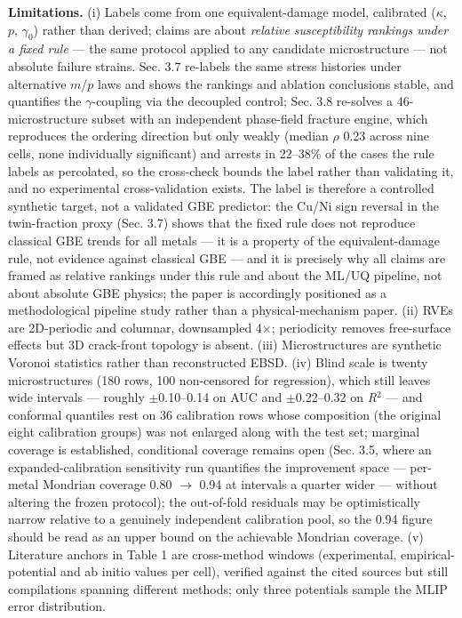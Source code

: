 \documentclass[11pt]{article}
\begin{document}
\textbf{Limitations.} (i) Labels come from one equivalent-damage model, calibrated ($\kappa$, $p$, $\gamma_0$) rather than derived; claims are about \textit{relative susceptibility rankings under a fixed rule} --- the same protocol applied to any candidate microstructure --- not absolute failure strains. Sec. 3.7 re-labels the same stress histories under alternative $m$/$p$ laws and shows the rankings and ablation conclusions stable, and quantifies the $\gamma$-coupling via the decoupled control; Sec. 3.8 re-solves a 46-microstructure subset with an independent phase-field fracture engine, which reproduces the ordering direction but only weakly (median $\rho$ 0.23 across nine cells, none individually significant) and arrests in 22--38\% of the cases the rule labels as percolated, so the cross-check bounds the label rather than validating it, and no experimental cross-validation exists. The label is therefore a controlled synthetic target, not a validated GBE predictor: the Cu/Ni sign reversal in the twin-fraction proxy (Sec. 3.7) shows that the fixed rule does not reproduce classical GBE trends for all metals --- it is a property of the equivalent-damage rule, not evidence against classical GBE --- and it is precisely why all claims are framed as relative rankings under this rule and about the ML/UQ pipeline, not about absolute GBE physics; the paper is accordingly positioned as a methodological pipeline study rather than a physical-mechanism paper. (ii) RVEs are 2D-periodic and columnar, downsampled 4$\times$; periodicity removes free-surface effects but 3D crack-front topology is absent. (iii) Microstructures are synthetic Voronoi statistics rather than reconstructed EBSD. (iv) Blind scale is twenty microstructures (180 rows, 100 non-censored for regression), which still leaves wide intervals --- roughly $\pm$0.10--0.14 on AUC and $\pm$0.22--0.32 on \textit{R}$^{2}$ --- and conformal quantiles rest on 36 calibration rows whose composition (the original eight calibration groups) was not enlarged along with the test set; marginal coverage is established, conditional coverage remains open (Sec. 3.5, where an expanded-calibration sensitivity run quantifies the improvement space --- per-metal Mondrian coverage 0.80 $\rightarrow$ 0.94 at intervals a quarter wider --- without altering the frozen protocol); the out-of-fold residuals may be optimistically narrow relative to a genuinely independent calibration pool, so the 0.94 figure should be read as an upper bound on the achievable Mondrian coverage. (v) Literature anchors in Table 1 are cross-method windows (experimental, empirical-potential and ab initio values per cell), verified against the cited sources but still compilations spanning different methods; only three potentials sample the MLIP error distribution.
\end{document}
